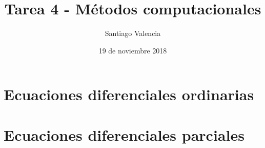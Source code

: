 \documentclass{article}
\title{Tarea 4 - Métodos computacionales}
\author{Santiago Valencia}
\date{19 de noviembre 2018}
\begin{document}
\maketitle

\section*{Ecuaciones diferenciales ordinarias}

\section*{Ecuaciones diferenciales parciales}
\end{document}
